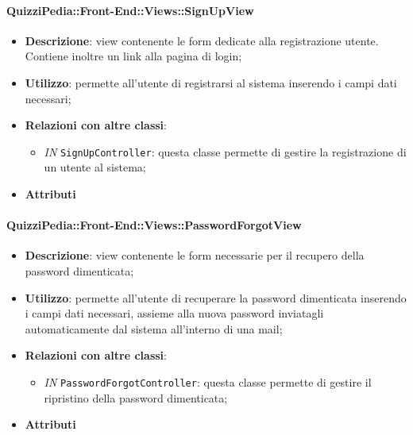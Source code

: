 \paragraph{QuizziPedia::Front-End::Views::SignUpView}
\begin{itemize}
	\item \textbf{Descrizione}: view contenente le form dedicate alla registrazione utente. Contiene inoltre un link alla pagina di login;
	\item \textbf{Utilizzo}: permette all'utente di registrarsi al sistema inserendo i campi dati necessari;
	\item \textbf{Relazioni con altre classi}:
	\begin{itemize}
		\item \textit{IN} \texttt{SignUpController}: questa classe permette di gestire la registrazione di un utente al sistema;
	\end{itemize}
	\item \textbf{Attributi}
\end{itemize}

\paragraph{QuizziPedia::Front-End::Views::PasswordForgotView}
\begin{itemize}
	\item \textbf{Descrizione}: view contenente le form necessarie per il recupero della password dimenticata;
	\item \textbf{Utilizzo}: permette all'utente di recuperare la password dimenticata inserendo i campi dati necessari, assieme alla nuova password inviatagli automaticamente dal sistema all'interno di una mail;
	\item \textbf{Relazioni con altre classi}:
	\begin{itemize}
		\item \textit{IN} \texttt{PasswordForgotController}: questa classe permette di gestire il ripristino della password dimenticata;
	\end{itemize}
	\item \textbf{Attributi}
\end{itemize}

